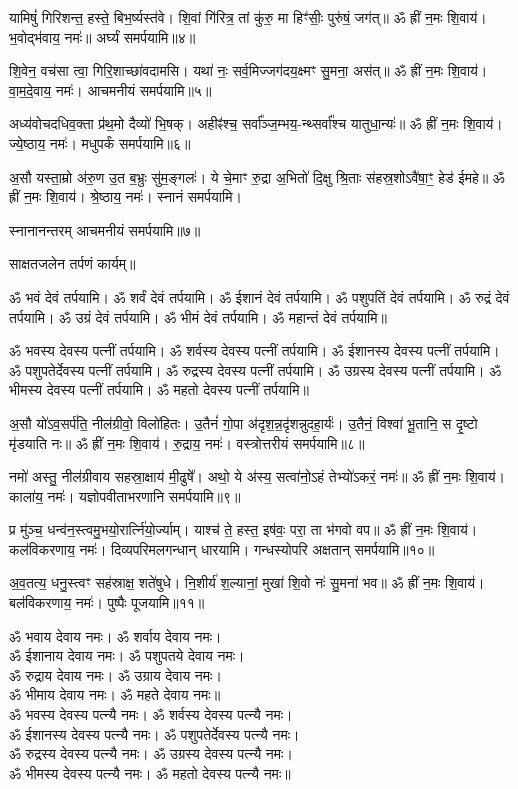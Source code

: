 यामिषुं॑ गिरिशन्त॒ हस्ते॒ बिभ॒र्ष्यस्त॑वे। शि॒वां गि॑रित्र॒ तां कु॑रु॒ मा हिꣳ॑सीः॒ पुरु॑षं॒ जग॑त्॥ ॐ ह्रीं न॒मः शि॒वाय॑। भ॒वोद्भ॑वाय॒ नमः॑॥ अर्घ्यं समर्पयामि॥४॥

शि॒वेन॒ वच॑सा त्वा॒ गिरि॒शाच्छा॑वदामसि। यथा॑ नः॒ सर्व॒मिज्जग॑दय॒क्ष्मꣳ सु॒मना॒ अस॑त्॥ ॐ ह्रीं न॒मः शि॒वाय॑। वा॒म॒दे॒वाय॒ नमः॑। आचमनीयं समर्पयामि॥५॥

अध्य॑वोचदधिव॒क्ता प्र॑थ॒मो दैव्यो॑ भि॒षक्। अहीꣴ॑श्च॒ सर्वा᳚ञ्ज॒म्भय॒-न्थ्सर्वा᳚श्च यातुधा॒न्यः॑॥ ॐ ह्रीं न॒मः शि॒वाय॑। ज्ये॒ष्ठाय॒ नमः॑। मधुपर्कं समर्पयामि॥६॥

अ॒सौ यस्ता॒म्रो अ॑रु॒ण उ॒त ब॒भ्रुः सु॑म॒ङ्गलः॑। ये चे॒माꣳ रु॒द्रा अ॒भितो॑ दि॒क्षु श्रि॒ताः स॑हस्र॒शोऽवै॑षा॒ꣳ॒ हेड॑ ईमहे॥ ॐ ह्रीं न॒मः शि॒वाय॑। श्रे॒ष्ठाय॒ नमः॑। स्नानं समर्पयामि। 




स्नानानन्तरम् आचमनीयं समर्पयामि॥७॥

साक्षतजलेन तर्पणं कार्यम्॥

ॐ भवं देवं तर्पयामि। ॐ शर्वं देवं तर्पयामि। ॐ ईशानं देवं तर्पयामि। ॐ पशुपतिं देवं तर्पयामि। ॐ रुद्रं देवं तर्पयामि। ॐ उग्रं देवं तर्पयामि। ॐ भीमं देवं तर्पयामि। ॐ महान्तं देवं तर्पयामि॥

ॐ भवस्य देवस्य पत्नीं तर्पयामि। ॐ शर्वस्य देवस्य पत्नीं तर्पयामि। ॐ ईशानस्य देवस्य पत्नीं तर्पयामि। ॐ पशुपतेर्देवस्य पत्नीं तर्पयामि। ॐ रुद्रस्य देवस्य पत्नीं तर्पयामि। ॐ उग्रस्य देवस्य पत्नीं तर्पयामि। ॐ भीमस्य देवस्य पत्नीं तर्पयामि। ॐ महतो देवस्य पत्नीं तर्पयामि॥


अ॒सौ यो॑ऽव॒सर्प॑ति॒ नील॑ग्रीवो॒ विलो॑हितः। उ॒तैनं॑ गो॒पा अ॑दृश॒न्न॒दृ॑शन्नुदहा॒र्यः॑। उ॒तैनं॒ विश्वा॑ भू॒तानि॒ स दृ॒ष्टो मृ॑डयाति नः॥ ॐ ह्रीं न॒मः शि॒वाय॑। रु॒द्राय॒ नमः॑। वस्त्रोत्तरीयं समर्पयामि॥८॥

नमो॑ अस्तु॒ नील॑ग्रीवाय सहस्रा॒क्षाय॑ मी॒ढुषे᳚। अथो॒ ये अ॑स्य॒ सत्वा॑नो॒ऽहं तेभ्यो॑ऽकरं॒ नमः॑॥ ॐ ह्रीं न॒मः शि॒वाय॑। काला॑य॒ नमः॑। यज्ञोपवीताभरणानि समर्पयामि॥९॥

प्र मु॑ञ्च॒ धन्व॑न॒स्त्वमु॒भयो॒रार्त्नि॑यो॒र्ज्याम्। याश्च॑ ते॒ हस्त॒ इष॑वः॒ परा॒ ता भ॑गवो वप॥ ॐ ह्रीं न॒मः शि॒वाय॑। कल॑विकरणाय॒ नमः॑। दिव्यपरिमलगन्धान् धारयामि। गन्धस्योपरि अक्षतान् समर्पयामि॥१०॥

अ॒व॒तत्य॒ धनु॒स्त्वꣳ सह॑स्राक्ष॒ शते॑षुधे। नि॒शीर्य॑ श॒ल्यानां॒ मुखा॑ शि॒वो नः॑ सु॒मना॑ भव॥ ॐ ह्रीं न॒मः शि॒वाय॑। बल॑विकरणाय॒ नमः॑। पुष्पैः पूजयामि॥११॥


ॐ भवाय देवाय नमः। ॐ शर्वाय देवाय नमः। \\
ॐ ईशानाय देवाय नमः। ॐ पशुपतये देवाय नमः।\\
ॐ रुद्राय देवाय नमः। ॐ उग्राय देवाय नमः।\\
ॐ भीमाय देवाय नमः। ॐ महते देवाय नमः॥\\
ॐ भवस्य देवस्य पत्न्यै नमः। ॐ शर्वस्य देवस्य पत्न्यै नमः।\\
ॐ ईशानस्य देवस्य पत्न्यै नमः। ॐ पशुपतेर्देवस्य पत्न्यै नमः।\\
ॐ रुद्रस्य देवस्य पत्न्यै नमः। ॐ उग्रस्य देवस्य पत्न्यै नमः।\\
ॐ भीमस्य देवस्य पत्न्यै नमः। ॐ महतो देवस्य पत्न्यै नमः॥ \\


